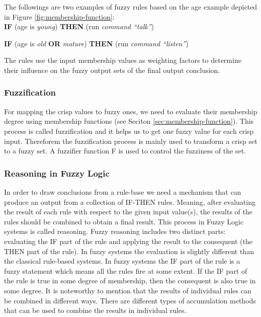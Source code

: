 \documentclass[11pt]{article}
\begin{document}
The followings are two examples of fuzzy
rules based on the age example depicted in Figure
\ref{fig:membership-function}:\\

\textbf{IF} (age is \textit{young}) \textbf{THEN} (run \textit{command
``talk''})
 
\textbf{IF} (age is \textit{old} \textbf{OR} \textit{mature}) \textbf{THEN} (run
\textit{command ``listen''})

The rules use the input membership values as weighting factors to determine
their influence on the fuzzy output sets of the final output conclusion.

\subsubsection{Fuzzification}
\label{sec:fuzzification}

For mapping the crisp values to fuzzy ones, we need to evaluate their membership
degree using membership functions (see Seciton \ref{sec:membership-function}).
This process is called fuzzification and it helps us to get one fuzzy value for
each crisp input. Thereforem the fuzzification process is mainly used to
transform a crisp set to a fuzzy set. A fuzzifier function F is used to control
the fuzziness of the set.

\subsubsection{Reasoning in Fuzzy Logic}
\label{sec:reasoning}

In order to draw conclusions from a rule-base we need a mechanism that can
produce an output from a collection of IF-THEN rules. Meaning, after evaluating
the result of each rule with respect to the given input value(s), the results of
the rules should be combined to obtain a final result. This process in Fuzzy
Logic systems is called reasoning. Fuzzy reasoning includes two distinct parts:
evaluating the IF part of the rule and applying the result to the consequent
(the THEN part of the rule). In fuzzy systems the evaluation is slightly
different than the classical rule-based systems. In fuzzy systems the IF part of
the rule is a fuzzy statement which means all the rules fire at some extent. If
the IF part of the rule is true in some degree of membership, then the
consequent is also true in some degree. It is noteworthy to mention that the
results of individual rules can be combined in different ways. There are
different types of accumulation methods that can be used to combine the results
in individual rules.
\end{document}
